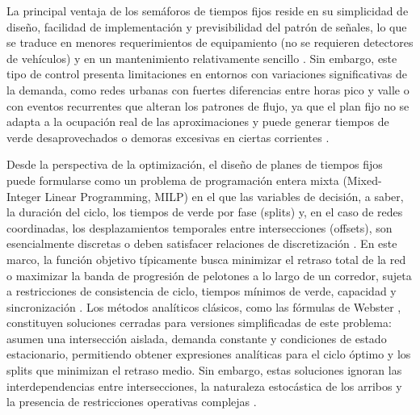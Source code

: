 La principal ventaja de los semáforos de tiempos fijos reside en su simplicidad de diseño, facilidad de implementación y previsibilidad del patrón de señales, lo que se traduce en menores requerimientos de equipamiento (no se requieren detectores de vehículos) y en un mantenimiento relativamente sencillo \cite{garber2019traffic,roess2019traffic}. Sin embargo, este tipo de control presenta limitaciones en entornos con variaciones significativas de la demanda, como redes urbanas con fuertes diferencias entre horas pico y valle o con eventos recurrentes que alteran los patrones de flujo, ya que el plan fijo no se adapta a la ocupación real de las aproximaciones y puede generar tiempos de verde desaprovechados o demoras excesivas en ciertas corrientes \cite{papageorgiou2003review,stevanovic2010adaptive}.

Desde la perspectiva de la optimización, el diseño de planes de tiempos fijos puede formularse como un problema de programación entera mixta (Mixed-Integer Linear Programming, MILP) en el que las variables de decisión, a saber, la duración del ciclo, los tiempos de verde por fase (splits) y, en el caso de redes coordinadas, los desplazamientos temporales entre intersecciones (offsets), son esencialmente discretas o deben satisfacer relaciones de discretización \cite{gartner1975multiband,wong1998optimizing}. En este marco, la función objetivo típicamente busca minimizar el retraso total de la red o maximizar la banda de progresión de pelotones a lo largo de un corredor, sujeta a restricciones de consistencia de ciclo, tiempos mínimos de verde, capacidad y sincronización \cite{gartner1975multiband,hillier1967mixed}. Los métodos analíticos clásicos, como las fórmulas de Webster \cite{webster1958traffic}, constituyen soluciones cerradas para versiones simplificadas de este problema: asumen una intersección aislada, demanda constante y condiciones de estado estacionario, permitiendo obtener expresiones analíticas para el ciclo óptimo y los splits que minimizan el retraso medio. Sin embargo, estas soluciones ignoran las interdependencias entre intersecciones, la naturaleza estocástica de los arribos y la presencia de restricciones operativas complejas \cite{wong1998optimizing,papageorgiou2003review}.

